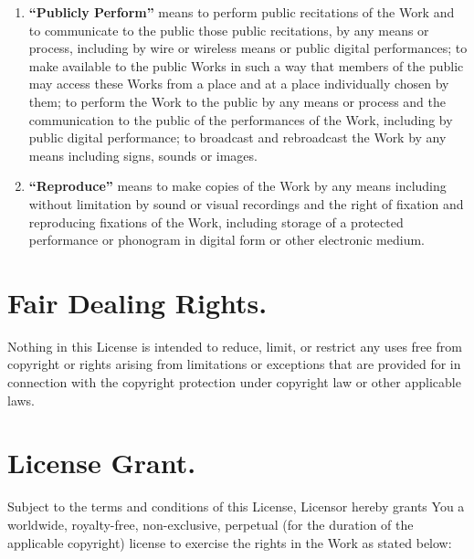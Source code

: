 \begin{enumerate}
\item \textbf{``Publicly Perform''} means to perform
  public recitations of the Work and to communicate to the
  public those public recitations, by any means or process,
  including by wire or wireless means or public digital
  performances; to make available to the public Works in
  such a way that members of the public may access these
  Works from a place and at a place individually chosen by
  them; to perform the Work to the public by any means or
  process and the communication to the public of the
  performances of the Work, including by public digital
  performance; to broadcast and rebroadcast the Work by any
  means including signs, sounds or images.

\item \textbf{``Reproduce''} means to make copies of
  the Work by any means including without limitation by
  sound or visual recordings and the right of fixation and
  reproducing fixations of the Work, including storage of a
  protected performance or phonogram in digital form or
  other electronic medium.
\end{enumerate}

\section{Fair Dealing Rights.} Nothing in this
License is intended to reduce, limit, or restrict any uses
free from copyright or rights arising from limitations or
exceptions that are provided for in connection with the
copyright protection under copyright law or other
applicable laws.

\section{License Grant.} Subject to the terms
and conditions of this License, Licensor hereby grants You
a worldwide, royalty-free, non-exclusive, perpetual (for
the duration of the applicable copyright) license to
exercise the rights in the Work as stated below:

